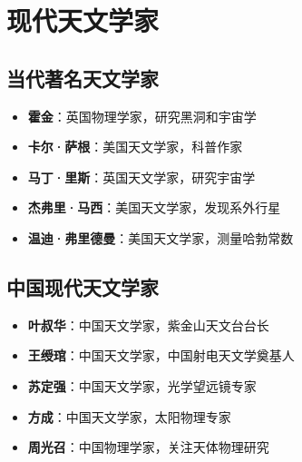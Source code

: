 \documentclass[12pt,UTF8]{ctexbook}
\begin{document}
\chapter{现代天文学家}
\section{当代著名天文学家}

\begin{itemize}
  \item \textbf{霍金}：英国物理学家，研究黑洞和宇宙学
  \item \textbf{卡尔·萨根}：美国天文学家，科普作家
  \item \textbf{马丁·里斯}：英国天文学家，研究宇宙学
  \item \textbf{杰弗里·马西}：美国天文学家，发现系外行星
  \item \textbf{温迪·弗里德曼}：美国天文学家，测量哈勃常数
\end{itemize}

\section{中国现代天文学家}

\begin{itemize}
  \item \textbf{叶叔华}：中国天文学家，紫金山天文台台长
  \item \textbf{王绶琯}：中国天文学家，中国射电天文学奠基人
  \item \textbf{苏定强}：中国天文学家，光学望远镜专家
  \item \textbf{方成}：中国天文学家，太阳物理专家
  \item \textbf{周光召}：中国物理学家，关注天体物理研究
\end{itemize}

\backmatter
\end{document}
